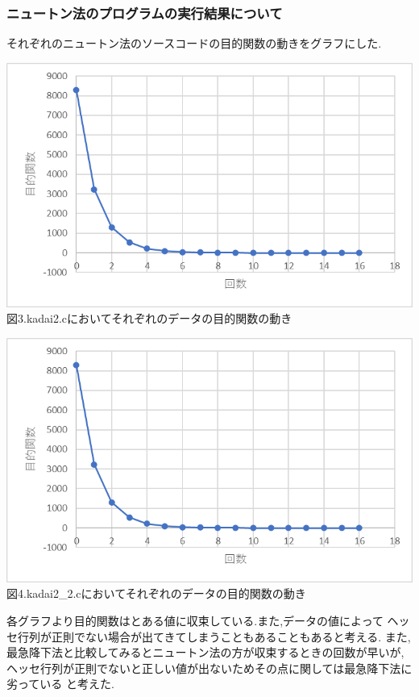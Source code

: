 \documentclass[12pt]{jarticle}
\begin{document}
\subsubsection{ニュートン法のプログラムの実行結果について}
それぞれのニュートン法のソースコードの目的関数の動きをグラフにした.\\
\begin{center}
    \includegraphics[width=15cm,clip]{3.png}\\
    図3.kadai2.cにおいてそれぞれのデータの目的関数の動き\\
\end{center}
\begin{center}
    \includegraphics[width=15cm,clip]{3.png}\\
    図4.kadai2\_2.cにおいてそれぞれのデータの目的関数の動き\\
\end{center}
各グラフより目的関数はとある値に収束している.また,データの値によって
ヘッセ行列が正則でない場合が出てきてしまうこともあることもあると考える.
また,最急降下法と比較してみるとニュートン法の方が収束するときの回数が早いが,
ヘッセ行列が正則でないと正しい値が出ないためその点に関しては最急降下法に劣っている
と考えた.
\end{document}
